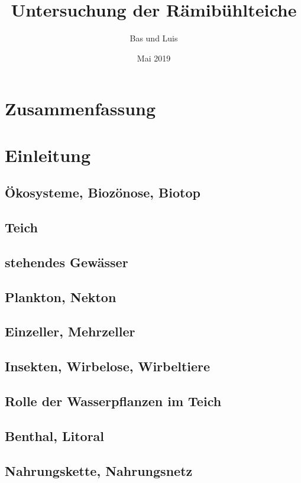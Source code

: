 \documentclass{article}
\title{Untersuchung der Rämibühlteiche}
\author{Bas und Luis}
\date{Mai 2019}
\begin{document}
\maketitle

\section{Zusammenfassung}


\section{Einleitung}

\subsection{Ökosysteme, Biozönose, Biotop}

\subsection{Teich}

\subsection{stehendes Gewässer}

\subsection{Plankton, Nekton}

\subsection{Einzeller, Mehrzeller}

\subsection{Insekten, Wirbelose, Wirbeltiere}

\subsection{Rolle der Wasserpflanzen im Teich}

\subsection{Benthal, Litoral}

\subsection{Nahrungskette, Nahrungsnetz}
\end{document}
